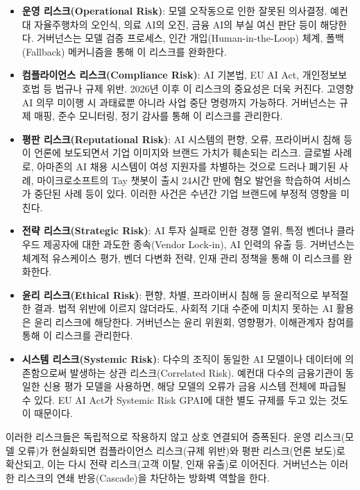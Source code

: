 \begin{itemize}
    \item \textbf{운영 리스크(Operational Risk)}: 모델 오작동으로 인한 잘못된 의사결정. 예컨대 자율주행차의 오인식, 의료 AI의 오진, 금융 AI의 부실 여신 판단 등이 해당한다. 거버넌스는 모델 검증 프로세스, 인간 개입(Human-in-the-Loop) 체계, 폴백(Fallback) 메커니즘을 통해 이 리스크를 완화한다.
    \item \textbf{컴플라이언스 리스크(Compliance Risk)}: AI 기본법, EU AI Act, 개인정보보호법 등 법규나 규제 위반. 2026년 이후 이 리스크의 중요성은 더욱 커진다. 고영향 AI 의무 미이행 시 과태료뿐 아니라 사업 중단 명령까지 가능하다. 거버넌스는 규제 매핑, 준수 모니터링, 정기 감사를 통해 이 리스크를 관리한다.
    \item \textbf{평판 리스크(Reputational Risk)}: AI 시스템의 편향, 오류, 프라이버시 침해 등이 언론에 보도되면서 기업 이미지와 브랜드 가치가 훼손되는 리스크. 글로벌 사례로, 아마존의 AI 채용 시스템이 여성 지원자를 차별하는 것으로 드러나 폐기된 사례, 마이크로소프트의 Tay 챗봇이 출시 24시간 만에 혐오 발언을 학습하여 서비스가 중단된 사례 등이 있다. 이러한 사건은 수년간 기업 브랜드에 부정적 영향을 미친다.
    \item \textbf{전략 리스크(Strategic Risk)}: AI 투자 실패로 인한 경쟁 열위, 특정 벤더나 클라우드 제공자에 대한 과도한 종속(Vendor Lock-in), AI 인력의 유출 등. 거버넌스는 체계적 유스케이스 평가, 벤더 다변화 전략, 인재 관리 정책을 통해 이 리스크를 완화한다.
    \item \textbf{윤리 리스크(Ethical Risk)}: 편향, 차별, 프라이버시 침해 등 윤리적으로 부적절한 결과. 법적 위반에 이르지 않더라도, 사회적 기대 수준에 미치지 못하는 AI 활용은 윤리 리스크에 해당한다. 거버넌스는 윤리 위원회, 영향평가, 이해관계자 참여를 통해 이 리스크를 관리한다.
    \item \textbf{시스템 리스크(Systemic Risk)}: 다수의 조직이 동일한 AI 모델이나 데이터에 의존함으로써 발생하는 상관 리스크(Correlated Risk). 예컨대 다수의 금융기관이 동일한 신용 평가 모델을 사용하면, 해당 모델의 오류가 금융 시스템 전체에 파급될 수 있다. EU AI Act가 Systemic Risk GPAI에 대한 별도 규제를 두고 있는 것도 이 때문이다.
\end{itemize}

이러한 리스크들은 독립적으로 작용하지 않고 상호 연결되어 증폭된다. 운영 리스크(모델 오류)가 현실화되면 컴플라이언스 리스크(규제 위반)와 평판 리스크(언론 보도)로 확산되고, 이는 다시 전략 리스크(고객 이탈, 인재 유출)로 이어진다. 거버넌스는 이러한 리스크의 연쇄 반응(Cascade)을 차단하는 방화벽 역할을 한다.

